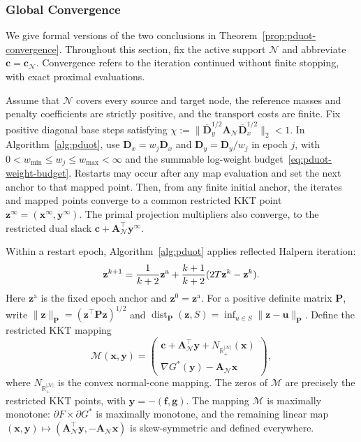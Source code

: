 \subsubsection{Global Convergence}
\label{app:pduot-global}

We give formal versions of the two conclusions in Theorem~\ref{prop:pduot-convergence}.
Throughout this section, fix the active support $\mathcal N$ and abbreviate $\mathbf c=\mathbf c_{\mathcal N}$.
Convergence refers to the iteration continued without finite stopping, with exact proximal evaluations.

\begin{theorem}
\label{thm:pduot-global}
Assume that $\mathcal N$ covers every source and target node, the reference masses and penalty coefficients are strictly positive, and the transport costs are finite.
Fix positive diagonal base steps satisfying $\chi:=\|\overline{\mathbf D}_y^{1/2}\mathbf A_{\mathcal N}\overline{\mathbf D}_x^{1/2}\|_2<1$.
In Algorithm~\ref{alg:pduot}, use $\mathbf D_x=w_j\overline{\mathbf D}_x$ and $\mathbf D_y=\overline{\mathbf D}_y/w_j$ in epoch $j$, with $0<w_{\min}\leq w_j\leq w_{\max}<\infty$ and the summable log-weight budget~\eqref{eq:pduot-weight-budget}.
Restarts may occur after any map evaluation and set the next anchor to that mapped point.
Then, from any finite initial anchor, the iterates and mapped points converge to a common restricted KKT point $\mathbf z^\infty=(\mathbf x^\infty,\mathbf y^\infty)$.
The primal projection multipliers also converge, to the restricted dual slack $\mathbf c+\mathbf A_{\mathcal N}^{\top}\mathbf y^\infty$.
\end{theorem}
Within a restart epoch, Algorithm~\ref{alg:pduot} applies reflected Halpern iteration:
\begin{equation}
\label{eq:halpern}
\mathbf z^{k+1}=\frac{1}{k+2}\mathbf z^{\mathrm a}+\frac{k+1}{k+2}(2T\mathbf z^k-\mathbf z^k).
\end{equation}
Here $\mathbf z^{\mathrm a}$ is the fixed epoch anchor and $\mathbf z^0=\mathbf z^{\mathrm a}$.
For a positive definite matrix $\mathbf{P}$, write $\|\mathbf{z}\|_\mathbf{P}=(\mathbf{z}^\top \mathbf{P}\mathbf{z})^{1/2}$ and $\operatorname{dist}_\mathbf{P}(\mathbf{z},S)=\inf_{u\in S}\|\mathbf{z}-\mathbf{u}\|_\mathbf{P}$.
Define the restricted KKT mapping
\begin{equation}
\label{eq:pduot-kkt-map}
\mathcal M(\mathbf{x},\mathbf{y})=\begin{pmatrix}\mathbf{c}+\mathbf{A}_{\mathcal N}^\top \mathbf{y}+N_{\mathbb R_+^{|\mathcal N|}}(\mathbf{x})\\ \nabla G^*(\mathbf{y})-\mathbf{A}_{\mathcal N}\mathbf{x}\end{pmatrix},
\end{equation}
where $N_{\mathbb R_+^{|\mathcal N|}}$ is the convex normal-cone mapping.
The zeros of $\mathcal M$ are precisely the restricted KKT points, with $\mathbf{y}=-(\mathbf{f},\mathbf{g})$.
The mapping $\mathcal M$ is maximally monotone: $\partial F\times\partial G^*$ is maximally monotone, and the remaining linear map $(\mathbf{x},\mathbf{y})\mapsto(\mathbf{A}_{\mathcal N}^\top \mathbf{y},-\mathbf{A}_{\mathcal N}\mathbf{x})$ is skew-symmetric and defined everywhere.

